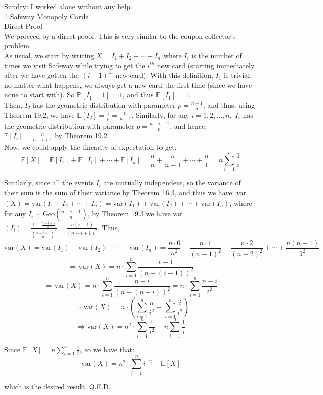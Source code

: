 \documentclass{article}
\begin{document}
Sundry: I worked alone without any help. \\[1cm]
{\Large 1 Safeway Monopoly Cards} \\[.5cm]
{\color{red} Direct Proof} \\

We proceed by a direct proof. This is very similar to the coupon collector's problem. \\

As usual, we start by writing $X = I_1 + I_2 + \cdots + I_n$ where $I_i$ is the number of times we visit Safeway while trying to get the $i^{th}$ new card (starting immediately after we have gotten the $(i-1)^{th}$ new card). With this definition, $I_1$ is trivial: no matter what happens, we always get a new card the first time (since we have none to start with). So $\mathbb{P}[I_1 = 1] = 1$, and thus $\mathbb{E}[I_1] = 1$. \\

Then, $I_2$ has the geometric distribution with parameter $p = \frac{n-1}{n}$, and thus, using Theorem 19.2, we have $\mathbb{E}[I_2] = \frac{1}{p} = \frac{n}{n-1}$. Similarly, for any $i = 1,2,\dots,n,$ $I_i$ has the geometric distribution with parameter
$p = \frac{n-i+1}{n}$, and hence, $\mathbb{E}[I_i] = \frac{n}{n-i+1}$ by Theorem 19.2. \\

Now, we could apply the linearity of expectation to get:
$$\mathbb{E}[X] = \mathbb{E}[I_1] + \mathbb{E}[I_1] + \cdots + \mathbb{E}[I_n] = \frac{n}{n} + \frac{n}{n-1} + \cdots + \frac{n}{1} = n\sum\limits_{i=1}^n \frac{1}{i}$$

Similarly, since all the events $I_i$ are mutually independent, so the variance of their sum is the sum of their variance by Theorem 16.3, and thus we have:
var$(X) = \text{var}(I_1 + I_2 + \cdots + I_n) = \text{var}(I_1) + \text{var}(I_2) + \cdots + \text{var}(I_n)$, where for any $I_i\sim\text{Geo}(\frac{n-i+1}{n})$, by Theorem 19.3 we have
var$(I_i) = \frac{1 - \frac{n-i+1}{n}}{(\frac{n-i+1}{n})^2} =
\frac{n(i-1)}{(n-i+1)^2}$. Thus,
$$\text{var}(X) =
\text{var}(I_1) + \text{var}(I_2) + \cdots + \text{var}(I_n) =
\frac{n\cdot0}{n^2} + \frac{n\cdot1}{(n-1)^2} + \frac{n\cdot2}{(n-2)^2} + \cdots + \frac{n(n-1)}{1^2}$$
$$\Longrightarrow \text{var}(X) = n\cdot\sum\limits_{i=1}^{n} \frac{i-1}{(n-(i-1))^2}$$
$$\Longrightarrow \text{var}(X) = n\cdot\sum\limits_{i=1}^{n} \frac{n-i}{(n-(n-i))^2} = n\cdot\sum\limits_{i=1}^{n} \frac{n-i}{i^2}$$
$$\Longrightarrow \text{var}(X) = n\cdot(\sum\limits_{i=1}^{n} \frac{n}{i^2} - \sum\limits_{i=1}^{n} \frac{i}{i^2})$$
$$\Longrightarrow \text{var}(X) = n^2\cdot\sum\limits_{i=1}^{n} \frac{1}{i^2} - n\sum\limits_{i=1}^{n} \frac{1}{i}$$

Since $\mathbb{E}[X] = n\sum\limits_{i=1}^n \frac{1}{i}$, so we have that:
$$\text{var}(X) = n^2\cdot\sum\limits_{i=1}^{n} i^{-2} - \mathbb{E}[X]$$

which is the desired result. Q.E.D.
\end{document}
